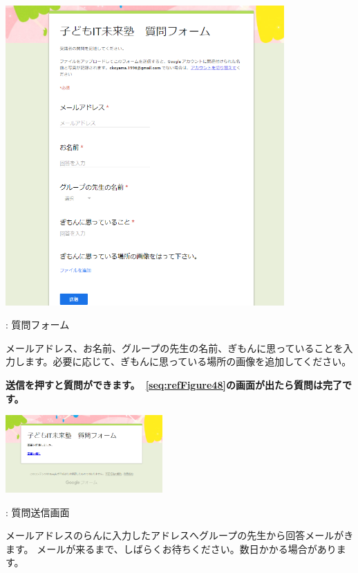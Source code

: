 \documentclass[a4paper,12pt]{jarticle}
\begin{document}
\centering
\begin{minipage}{\textwidth}
  {\upshape
    \includegraphics[width=0.8\textwidth]{textbook-img246.png}
    \flushleft

    \bigskip
    {\theFigure\label{seq:refFigure47}}: 質問フォーム}
\end{minipage}
\flushleft

\bigskip

メールアドレス、お名前、グループの先生の名前、ぎもんに思っていることを入力します。必要に応じて、ぎもんに思っている場所の画像を追加してください。

{\bfseries
送信\textmd{を押すと質問ができます。~\ref{seq:refFigure48}の画面が出たら質問は完了です。}}



\centering
\begin{minipage}{\textwidth}
  {\upshape
    \includegraphics[width=0.45\textwidth]{textbook-img247.png}
    \flushleft

    \bigskip
    {\theFigure\label{seq:refFigure48}}: 質問送信画面}
\end{minipage}
\flushleft
メールアドレスのらんに入力したアドレスへグループの先生から回答メールがきます。
メールが来るまで、しばらくお待ちください。数日かかる場合があります。
\end{document}
